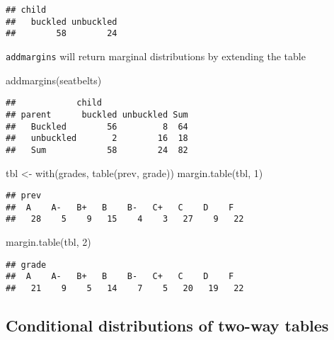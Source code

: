\documentclass[
]{book}
\newenvironment{Shaded}{\begin{snugshade}}{\end{snugshade}}
\newcommand{\DecValTok}[1]{\textcolor[rgb]{0.00,0.00,0.81}{#1}}
\newcommand{\FunctionTok}[1]{\textcolor[rgb]{0.00,0.00,0.00}{#1}}
\newcommand{\NormalTok}[1]{#1}
\newcommand{\OtherTok}[1]{\textcolor[rgb]{0.56,0.35,0.01}{#1}}
\theoremstyle{definition}
\theoremstyle{definition}
\theoremstyle{definition}
\theoremstyle{definition}
\theoremstyle{remark}
\begin{document}
\begin{verbatim}
## child
##   buckled unbuckled 
##        58        24
\end{verbatim}

\texttt{addmargins} will return marginal distributions by extending the table

\begin{Shaded}
\begin{Highlighting}[]
\FunctionTok{addmargins}\NormalTok{(seatbelts)}
\end{Highlighting}
\end{Shaded}

\begin{verbatim}
##            child
## parent      buckled unbuckled Sum
##   Buckled        56         8  64
##   unbuckled       2        16  18
##   Sum            58        24  82
\end{verbatim}

\begin{Shaded}
\begin{Highlighting}[]
\NormalTok{tbl }\OtherTok{\textless{}{-}} \FunctionTok{with}\NormalTok{(grades, }\FunctionTok{table}\NormalTok{(prev, grade))}
\FunctionTok{margin.table}\NormalTok{(tbl, }\DecValTok{1}\NormalTok{)}
\end{Highlighting}
\end{Shaded}

\begin{verbatim}
## prev
##  A    A-   B+   B    B-   C+   C    D    F   
##   28    5    9   15    4    3   27    9   22
\end{verbatim}

\begin{Shaded}
\begin{Highlighting}[]
\FunctionTok{margin.table}\NormalTok{(tbl, }\DecValTok{2}\NormalTok{)}
\end{Highlighting}
\end{Shaded}

\begin{verbatim}
## grade
##  A    A-   B+   B    B-   C+   C    D    F   
##   21    9    5   14    7    5   20   19   22
\end{verbatim}

\hypertarget{conditional-distributions-of-two-way-tables}{%
\subsection{Conditional distributions of two-way tables}\label{conditional-distributions-of-two-way-tables}}
\end{document}
